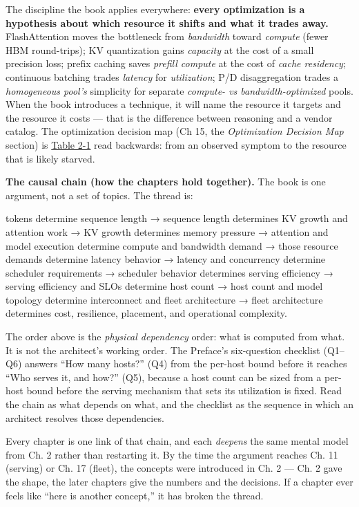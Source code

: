 The discipline the book applies everywhere: \textbf{every optimization
is a hypothesis about which resource it shifts and what it trades away.}
FlashAttention moves the bottleneck from \emph{bandwidth} toward
\emph{compute} (fewer HBM round-trips); KV quantization gains
\emph{capacity} at the cost of a small precision loss; prefix caching
saves \emph{prefill compute} at the cost of \emph{cache residency};
continuous batching trades \emph{latency} for \emph{utilization}; P/D
disaggregation trades a \emph{homogeneous pool's} simplicity for
separate \emph{compute- vs bandwidth-optimized} pools. When the book
introduces a technique, it will name the resource it targets and the
resource it costs --- that is the difference between reasoning and a
vendor catalog. The optimization decision map (Ch 15, the
\emph{Optimization Decision Map} section) is \hyperref[tab:2.1]{Table 2-1} read backwards:
from an observed symptom to the resource that is likely starved.

\textbf{The causal chain (how the chapters hold together).} The book is
one argument, not a set of topics. The thread is:

tokens determine sequence length → sequence length determines KV growth
and attention work → KV growth determines memory pressure → attention
and model execution determine compute and bandwidth demand → those
resource demands determine latency behavior → latency and concurrency
determine scheduler requirements → scheduler behavior determines serving
efficiency → serving efficiency and SLOs determine host count → host
count and model topology determine interconnect and fleet architecture →
fleet architecture determines cost, resilience, placement, and
operational complexity.

The order above is the \emph{physical dependency} order: what is
computed from what. It is not the architect's working order. The
Preface's six-question checklist (Q1--Q6) answers ``How many hosts?''
(Q4) from the per-host bound before it reaches ``Who serves it, and
how?'' (Q5), because a host count can be sized from a per-host bound
before the serving mechanism that sets its utilization is fixed. Read
the chain as what depends on what, and the checklist as the sequence in
which an architect resolves those dependencies.

Every chapter is one link of that chain, and each \emph{deepens} the
same mental model from Ch. 2 rather than restarting it. By the time the
argument reaches Ch. 11 (serving) or Ch. 17 (fleet), the concepts were
introduced in Ch. 2 --- Ch. 2 gave the shape, the later chapters give
the numbers and the decisions. If a chapter ever feels like ``here is
another concept,'' it has broken the thread.


